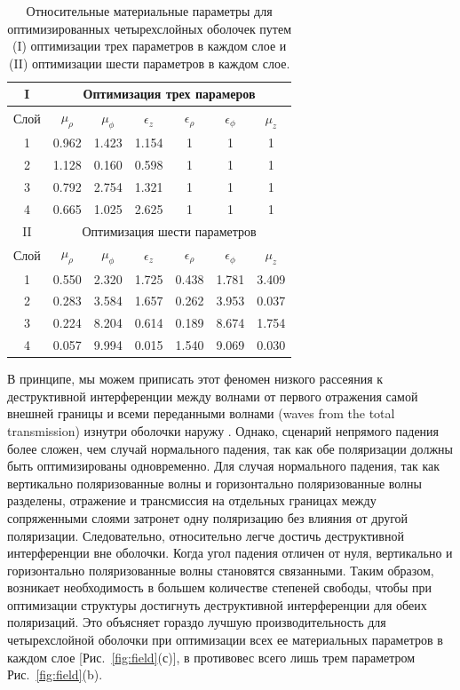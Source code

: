 \documentclass[a4paper, 12pt]{article}
\begin{document}
\begin{table}
\begin{center}
\begin{tabular}{|c|ccc|ccc|}
\hline
 I&\multicolumn{6}{c|}{Оптимизация трех парамеров} \\
\hline
 Слой & $\mu_{\rho}$ & $\mu_{\phi}$ & $\epsilon_{z}$  & $\epsilon_{\rho}$ & $\epsilon_{\phi}$ & $\mu_{z}$ \\
\hline
1 & 0.962 & 1.423 & 1.154 & 1 & 1 & 1\\
 2 & 1.128 &0.160  &  0.598 & 1 & 1 & 1\\
 3 & 0.792 & 2.754 & 1.321 &1 &  1 & 1\\
 4 & 0.665 & 1.025 & 2.625 &1 &  1 & 1 \\
 \hline
  II&\multicolumn{6}{c|}{Оптимизация шести параметров} \\
\hline
 Слой & $\mu_{\rho}$ & $\mu_{\phi}$ & $\epsilon_{z}$  & $\epsilon_{\rho}$ & $\epsilon_{\phi}$ & $\mu_{z}$ \\
\hline
1 & 0.550 & 2.320 & 1.725 & 0.438 & 1.781 & 3.409\\
 2 & 0.283 & 3.584 & 1.657 &  0.262 & 3.953 & 0.037\\
 3 & 0.224 & 8.204 & 0.614& 0.189 & 8.674 & 1.754\\
 4 & 0.057 & 9.994 & 0.015 & 1.540 & 9.069 & 0.030 \\
\hline
\end{tabular}
\caption{\label{table:params} Относительные материальные параметры для
оптимизированных четырехслойных оболочек путем (I) оптимизации трех
параметров в каждом слое и (II) оптимизации шести параметров в каждом слое.}
\end{center}
\end{table}

В принципе, мы можем приписать этот феномен низкого рассеяния к
деструктивной интерференции между волнами от первого отражения самой внешней
границы и всеми переданными волнами (waves from the total transmission) 
изнутри оболочки наружу \cite{12}. 
Однако, сценарий непрямого падения более сложен,
чем случай нормального падения, так как обе поляризации должны быть 
оптимизированы одновременно. Для случая нормального падения, так как 
вертикально поляризованные волны и горизонтально поляризованные волны 
разделены, отражение и трансмиссия на отдельных границах между сопряженными
слоями затронет одну поляризацию без влияния от другой поляризации. 
Следовательно, относительно легче достичь деструктивной интерференции
вне оболочки. Когда угол падения отличен от нуля, вертикально и горизонтально
поляризованные волны становятся связанными. Таким образом, возникает
необходимость в большем количестве степеней свободы, чтобы при оптимизации
структуры достигнуть деструктивной интерференции для обеих поляризаций.
Это объясняет гораздо лучшую производительность для четырехслойной оболочки
при оптимизации всех ее материальных параметров в каждом слое 
[Рис.~\ref{fig:field}(с)], в противовес всего лишь трем параметром
Рис.~\ref{fig:field}(b).
\end{document}
